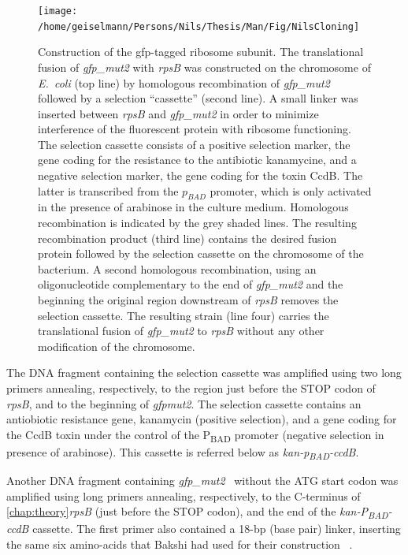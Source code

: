 \begin{figure}
\texttt{[image: /home/geiselmann/Persons/Nils/Thesis/Man/Fig/NilsCloning]}\caption{\label{fig:Cloning}Construction of the gfp-tagged ribosome subunit.
The translational fusion of \textit{gfp\_mut2} with \textit{rpsB}
was constructed on the chromosome of \textit{E.~coli} (top line)
by homologous recombination of \textit{gfp\_mut2} followed by a selection
``cassette'' (second line). A small linker was inserted between
\textit{rpsB} and \textit{gfp\_mut2} in order to minimize interference
of the fluorescent protein with ribosome functioning. The selection
cassette consists of a positive selection marker, the gene coding
for the resistance to the antibiotic kanamycine, and a negative selection
marker, the gene coding for the toxin CcdB. The latter is transcribed
from the $p_{BAD}$ promoter, which is only activated in the presence
of arabinose in the culture medium. Homologous recombination is indicated
by the grey shaded lines. The resulting recombination product (third
line) contains the desired fusion protein followed by the selection
cassette on the chromosome of the bacterium. A second homologous recombination,
using an oligonucleotide complementary to the end of \textit{gfp\_mut2}
and the beginning the original region downstream of \textit{rpsB}
removes the selection cassette. The resulting strain (line four) carries
the translational fusion of \textit{gfp\_mut2} to \textit{rpsB} without
any other modification of the chromosome.}

%
%
\end{figure}

The DNA fragment containing the selection cassette was amplified using
two long primers annealing, respectively, to the region just before
the STOP codon of \textit{rpsB}, and to the beginning of \textit{gfpmut2}.
The selection cassette contains an antiobiotic resistance gene, kanamycin
(positive selection), and a gene coding for the CcdB toxin under the
control of the P\textsubscript{BAD} promoter (negative selection
in presence of arabinose). This cassette is referred below as \textit{kan-p\textsubscript{BAD}-ccdB}.

Another DNA fragment containing \textit{gfp\_mut2}~\cite{zaslaver_comprehensive_2006}
without the ATG start codon was amplified using long primers annealing,
respectively, to the C-terminus of \ref{chap:theory}\textit{rpsB}
(just before the STOP codon), and the end of the \textit{kan-P\textsubscript{BAD}-ccdB}
cassette. The first primer also contained a 18-bp (base pair) linker,
inserting the same six amino-acids that Bakshi had used for their
construction ~\cite{bakshi_superresolution_2012}.

